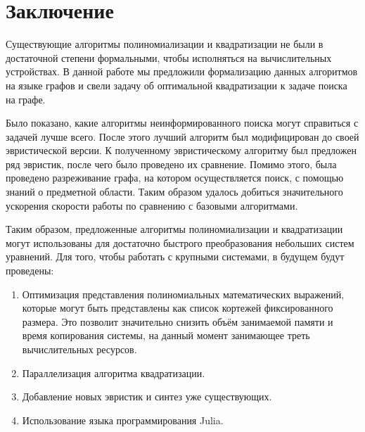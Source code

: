 
\section{Заключение}

Существующие алгоритмы полиномиализации и квадратизации не были в достаточной степени формальными, чтобы исполняться на вычислительных устройствах. В данной работе мы предложили формализацию данных алгоритмов на языке графов и свели задачу об оптимальной квадратизации к задаче поиска на графе.

Было показано, какие алгоритмы неинформированного поиска могут справиться с задачей лучше всего. После этого лучший алгоритм был модифицирован до своей эвристической версии. К полученному эвристическому алгоритму был предложен ряд эвристик, после чего было проведено их сравнение. Помимо этого, была проведено разреживание графа, на котором осуществляется поиск, с помощью знаний о предметной области. Таким образом удалось добиться значительного ускорения скорости работы по сравнению с базовыми алгоритмами.

Таким образом, предложенные алгоритмы полиномиализации и квадратизации могут использованы для достаточно быстрого преобразования небольших систем уравнений. Для того, чтобы работать с крупными системами, в будущем будут проведены:
\begin{enumerate}
    \item Оптимизация представления полиномиальных математических выражений, которые могут быть представлены как список кортежей фиксированного размера. Это позволит значительно снизить объём занимаемой памяти и время копирования системы, на данный момент занимающее треть вычислительных ресурсов.
    \item Параллелизация алгоритма квадратизации.
    \item Добавление новых эвристик и синтез уже существующих.
    \item Использование языка программирования Julia. 
\end{enumerate}
